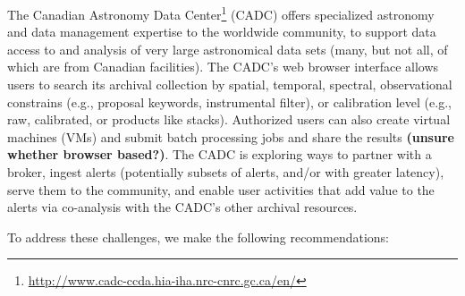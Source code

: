 The Canadian Astronomy Data Center\footnote{\url{http://www.cadc-ccda.hia-iha.nrc-cnrc.gc.ca/en/}} (CADC) offers specialized astronomy and data management expertise to the worldwide community, to support data access to and analysis of very large astronomical data sets (many, but not all, of which are from Canadian facilities). The CADC's web browser interface allows users to search its archival collection by spatial, temporal, spectral, observational constrains (e.g., proposal keywords, instrumental filter), or calibration level (e.g., raw, calibrated, or products like stacks). Authorized users can also create virtual machines (VMs) and submit batch processing jobs and share the results {\bf (unsure whether browser based?)}. The CADC is exploring ways to partner with a broker, ingest alerts (potentially subsets of alerts, and/or with greater latency), serve them to the community, and enable user activities that add value to the alerts via co-analysis with the CADC's other archival resources. 




To  address these challenges, we make the following recommendations: 
